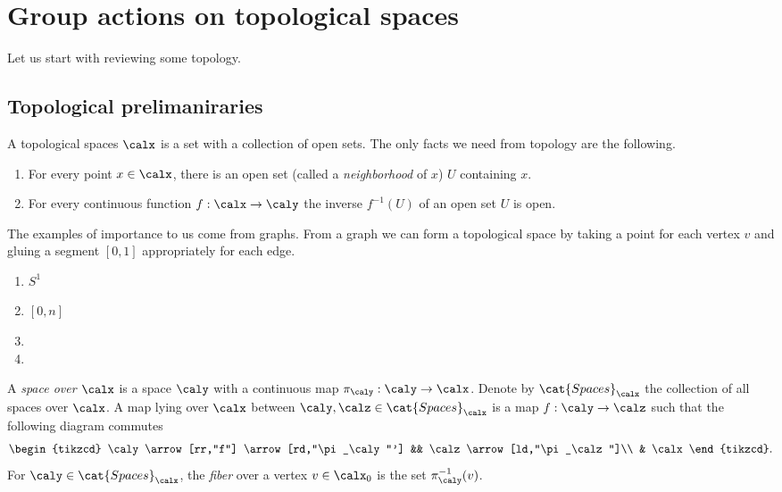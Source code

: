 \section{Group actions on topological spaces}
  Let us start with reviewing some topology.

  \subsection{Topological prelimaniraries}
  A topological spaces $\calx$ is a set with a collection of open sets.
  The only facts we need from topology are the following.
  \begin{enumerate}
    \item For every point $x \in \calx$, there is an open set (called a \emph{neighborhood} of $x$) $U$ containing $x$.
    \item For every continuous function $f: \calx \rightarrow \caly$ the inverse $f^{-1}(U)$ of an open set $U$ is open.
  \end{enumerate}

  The examples of importance to us come from graphs.
  From a graph we can form a topological space by taking a point for each vertex $v$ and gluing a segment $[0,1]$ appropriately for each edge.

  \begin{ex}
    \begin{enumerate}
      \item $S^1$
      \item $[0,n]$
      \item
      \item
    \end{enumerate}
  \end{ex}

  A \emph{space over $\calx$} is a space $\caly$ with a continuous map $\pi_\caly: \caly \rightarrow \calx$.
  Denote by $\cat{Spaces}_\calx$ the collection of all spaces over $\calx$.
  A map lying over $\calx$ between $\caly, \calz \in \cat{Spaces}_\calx$ is a map $f: \caly \rightarrow \calz$ such that the following diagram commutes
  \begin{equation*}
    \begin{tikzcd}
      \caly \arrow[rr,"f"] \arrow[rd,"\pi_\caly"']
      &&
      \calz \arrow[ld,"\pi_\calz"]\\
      & \calx
    \end{tikzcd}.
  \end{equation*}
  For $\caly \in \cat{Spaces}_\calx$, the \emph{fiber} over a vertex $v \in \calx_0$ is the set $\pi_\caly^{-1}(v)$.

